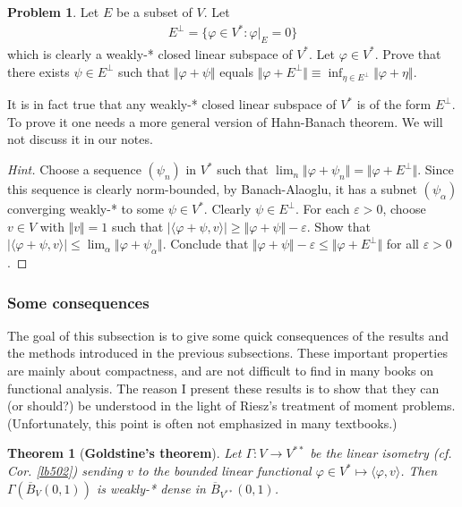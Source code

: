 \documentclass[12pt,b5paper,notitlepage]{article}
\theoremstyle{definition}
\newtheorem{prob}{\color{red}Problem}[section]
\theoremstyle{plain}
\newtheorem{thm}[df]{Theorem}
\newcommand{\ovl}{\overline}
\newcommand{\bk}[1]{\langle {#1}\rangle}
\newcommand{\eps}{\varepsilon}
\numberwithin{equation}{section}
\begin{document}
\begin{prob}\label{lb564}
Let $E$ be a subset of $V$. Let
\begin{align}
E^\perp=\{\varphi\in V^*:\varphi|_E=0\}
\end{align}
which is clearly a weakly-* closed linear subspace of $V^*$. Let $\varphi\in V^*$. Prove that there exists $\psi\in E^\perp$ such that $\Vert\varphi+\psi\Vert$ equals $\Vert\varphi+E^\perp\Vert\equiv\inf_{\eta\in E^\perp}\Vert\varphi+\eta\Vert$.
\end{prob}

It is in fact true that any weakly-* closed linear subspace of $V^*$ is of the form $E^\perp$. To prove it one needs a more general version of Hahn-Banach theorem. We will not discuss it in our notes.

\begin{proof}[Hint]
Choose a sequence $(\psi_n)$ in $V^*$ such that  $\lim_n\Vert \varphi+\psi_n\Vert=\Vert \varphi+E^\perp\Vert$. Since this sequence is clearly norm-bounded, by Banach-Alaoglu, it has a subnet $(\psi_\alpha)$ converging weakly-* to some $\psi\in V^*$. Clearly $\psi\in E^\perp$. For each $\eps>0$, choose $v\in V$ with $\Vert v\Vert=1$ such that $|\bk{\varphi+\psi,v}|\geq \Vert\varphi+\psi\Vert-\eps$. Show that $|\bk{\varphi+\psi,v}|\leq \lim_\alpha\Vert\varphi+\psi_\alpha\Vert$. Conclude that $\Vert\varphi+\psi\Vert-\eps\leq\Vert\varphi+E^\perp\Vert$ for all $\eps>0$.
\end{proof}







\subsubsection{Some consequences}


The goal of this subsection is to give some quick consequences of the results and the methods introduced in the previous subsections. These important properties are mainly about compactness, and are not difficult to find in many books on functional analysis. The reason I present these results is to show that they can (or should?) be understood in the light of Riesz's treatment of moment problems. (Unfortunately, this point is often not emphasized in many textbooks.)



\begin{thm}[\textbf{Goldstine's theorem}] 
Let $\Gamma:V\rightarrow V^{**}$ be the linear isometry (cf. Cor. \ref{lb502}) sending $v$ to the bounded linear functional $\varphi\in V^*\mapsto\bk{\varphi,v}$. Then $\Gamma(\ovl B_V(0,1))$ is weakly-* dense in $\ovl B_{V^{**}}(0,1)$. 
\end{thm}
\end{document}
